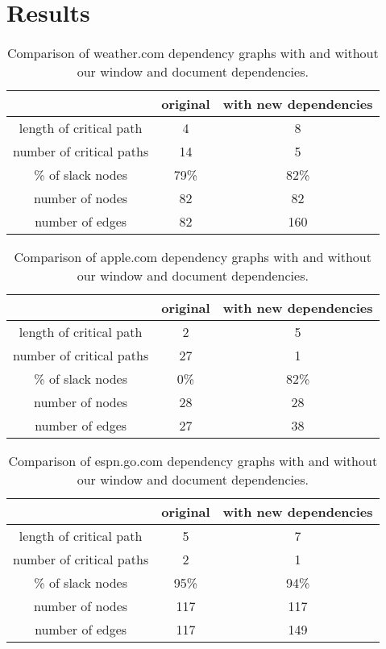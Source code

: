 \section{Results}

\begin{table*}[tb]
\centering
\small
\begin{tabular}{|c|c|c|}
\hline
 & original & with new dependencies \\
\hline
length of critical path & 4 & 8 \\
number of critical paths & 14 & 5 \\
\% of slack nodes & 79\% & 82\% \\
number of nodes & 82 & 82 \\
number of edges & 82 & 160 \\
\hline
\end{tabular}
\caption{Comparison of weather.com dependency graphs with and without our window and document dependencies.}
\label{t:weathergraph}
\end{table*}

\begin{table*}[tb]
\centering
\small
\begin{tabular}{|c|c|c|}
\hline
 & original & with new dependencies \\
\hline
length of critical path & 2 & 5 \\
number of critical paths & 27 & 1 \\
\% of slack nodes & 0\% & 82\% \\
number of nodes & 28 & 28 \\
number of edges & 27 & 38 \\
\hline
\end{tabular}
\caption{Comparison of apple.com dependency graphs with and without our window and document dependencies.}
\label{t:applegraph}
\end{table*}

\begin{table*}[tb]
\centering
\small
\begin{tabular}{|c|c|c|}
\hline
 & original & with new dependencies \\
\hline
length of critical path & 5 & 7 \\
number of critical paths & 2 & 1 \\
\% of slack nodes & 95\% & 94\% \\
number of nodes & 117 & 117 \\
number of edges & 117 & 149 \\
\hline
\end{tabular}\caption{Comparison of espn.go.com dependency graphs with and without our window and document dependencies.}
\label{t:espngraph}
\end{table*}

